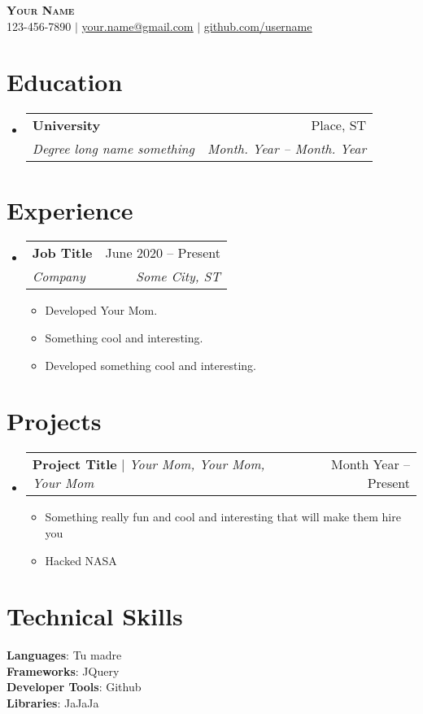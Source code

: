 \documentclass[letterpaper,11pt]{article}
\makeatletter
\newcommand{\resumeItem}[1]{
  \item\small{
    {#1 \vspace{-2pt}}
  }
}
\newcommand{\resumeSubheading}[4]{
  \vspace{-2pt}\item
    \begin{tabular*}{0.97\textwidth}[t]{l@{\extracolsep{\fill}}r}
      \textbf{#1} & #2 \\
      \textit{\small#3} & \textit{\small #4} \\
    \end{tabular*}\vspace{-7pt}
}
\newcommand{\resumeProjectHeading}[2]{
    \item
    \begin{tabular*}{0.97\textwidth}{l@{\extracolsep{\fill}}r}
      \small#1 & #2 \\
    \end{tabular*}\vspace{-7pt}
}
\newcommand{\resumeSubHeadingListStart}{\begin{itemize}[leftmargin=0.15in, label={}]}
\newcommand{\resumeSubHeadingListEnd}{\end{itemize}}
\newcommand{\resumeItemListStart}{\begin{itemize}}
\newcommand{\resumeItemListEnd}{\end{itemize}\vspace{-5pt}}
\makeatother
\begin{document}
\begin{center}
    \textbf{\Huge \scshape Your Name} \\ \vspace{1pt}
    \small 123-456-7890 $|$ \href{mailto:x@x.com}{\underline{your.name@gmail.com}} $|$ 
    \href{https://github.com/...}{\underline{github.com/username}}
\end{center}

\section{Education}
  \resumeSubHeadingListStart
    \resumeSubheading
      {University}{Place, ST}
      {Degree long name something}{Month. Year -- Month. Year}
  \resumeSubHeadingListEnd


\section{Experience}
  \resumeSubHeadingListStart

    \resumeSubheading
      {Job Title}{June 2020 -- Present}
      {Company}{Some City, ST}
      \resumeItemListStart
        \resumeItem{Developed Your Mom.}
        \resumeItem{Something cool and interesting.}
        \resumeItem{Developed something cool and interesting.}
      \resumeItemListEnd
  \resumeSubHeadingListEnd


\section{Projects}
    \resumeSubHeadingListStart
      \resumeProjectHeading
          {\textbf{Project Title} $|$ \emph{Your Mom, Your Mom, Your Mom}}{Month Year -- Present}
          \resumeItemListStart
            \resumeItem{Something really fun and cool and interesting that will make them hire you}
            \resumeItem{Hacked NASA}
          \resumeItemListEnd
    \resumeSubHeadingListEnd



\section{Technical Skills}
 \begin{itemize}[leftmargin=0.15in, label={}]
    \small{\item{
     \textbf{Languages}{: Tu madre} \\
     \textbf{Frameworks}{: JQuery} \\
     \textbf{Developer Tools}{: Github} \\
     \textbf{Libraries}{: JaJaJa}
    }}
 \end{itemize}
\end{document}
